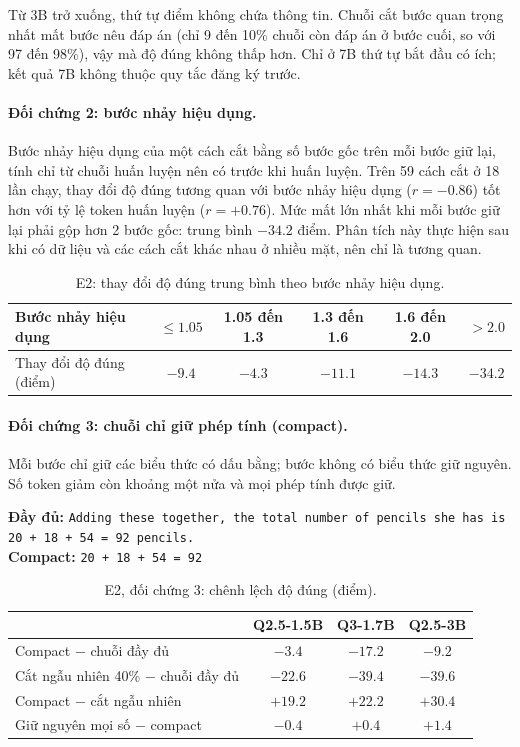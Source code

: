 \documentclass[11pt]{article}
\begin{document}
Từ 3B trở xuống, thứ tự điểm không chứa thông tin. Chuỗi cắt bước quan trọng nhất mất bước nêu đáp án
(chỉ 9 đến 10\% chuỗi còn đáp án ở bước cuối, so với 97 đến 98\%), vậy mà độ đúng không thấp hơn. Chỉ ở 7B
thứ tự bắt đầu có ích; kết quả 7B không thuộc quy tắc đăng ký trước.

\paragraph{Đối chứng 2: bước nhảy hiệu dụng.} Bước nhảy hiệu dụng của một cách cắt bằng số bước gốc trên
mỗi bước giữ lại, tính chỉ từ chuỗi huấn luyện nên có trước khi huấn luyện. Trên 59 cách cắt ở 18 lần chạy,
thay đổi độ đúng tương quan với bước nhảy hiệu dụng ($r=-0.86$) tốt hơn với tỷ lệ token huấn luyện
($r=+0.76$). Mức mất lớn nhất khi mỗi bước giữ lại phải gộp hơn 2 bước gốc: trung bình $-34.2$ điểm.
Phân tích này thực hiện sau khi có dữ liệu và các cách cắt khác nhau ở nhiều mặt, nên chỉ là tương quan.

\begin{table}[h]
\centering\small
\caption{E2: thay đổi độ đúng trung bình theo bước nhảy hiệu dụng.}
\begin{tabular}{lccccc}
\toprule
Bước nhảy hiệu dụng & $\le 1.05$ & 1.05 đến 1.3 & 1.3 đến 1.6 & 1.6 đến 2.0 & $>2.0$ \\
\midrule
Thay đổi độ đúng (điểm) & $-9.4$ & $-4.3$ & $-11.1$ & $-14.3$ & $-34.2$ \\
\bottomrule
\end{tabular}
\end{table}

\paragraph{Đối chứng 3: chuỗi chỉ giữ phép tính (compact).} Mỗi bước chỉ giữ các biểu thức có dấu bằng;
bước không có biểu thức giữ nguyên. Số token giảm còn khoảng một nửa và mọi phép tính được giữ.

\begin{vidu}
\textbf{Đầy đủ:} \texttt{Adding these together, the total number of pencils she has is 20 + 18 + 54 = 92
pencils.}\\
\textbf{Compact:} \texttt{20 + 18 + 54 = 92}
\end{vidu}

\begin{table}[h]
\centering\small
\caption{E2, đối chứng 3: chênh lệch độ đúng (điểm).}
\begin{tabular}{lccc}
\toprule
 & Q2.5-1.5B & Q3-1.7B & Q2.5-3B \\
\midrule
Compact $-$ chuỗi đầy đủ & $-3.4$ & $-17.2$ & $-9.2$ \\
Cắt ngẫu nhiên 40\% $-$ chuỗi đầy đủ & $-22.6$ & $-39.4$ & $-39.6$ \\
Compact $-$ cắt ngẫu nhiên & $+19.2$ & $+22.2$ & $+30.4$ \\
Giữ nguyên mọi số $-$ compact & $-0.4$ & $+0.4$ & $+1.4$ \\
\bottomrule
\end{tabular}
\end{table}
\end{document}
